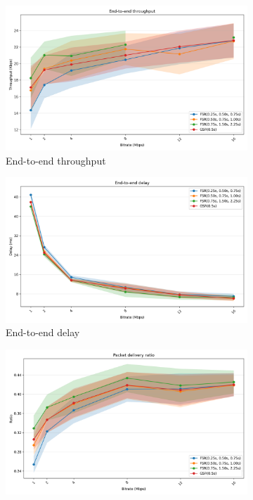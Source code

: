 \documentclass{winslabreport}
\begin{document}
\begin{figure}
    \centering
    \begin{subfigure}[b]{0.45\textwidth}
        \includegraphics[width=\textwidth]{../figures/bitrate/end-to-end_throughput.png}
        \caption{End-to-end throughput}
        \label{fig:tput_bitrate}
    \end{subfigure}
    \hfill
    \begin{subfigure}[b]{0.45\textwidth}
        \includegraphics[width=\textwidth]{../figures/bitrate/end-to-end_delay.png}
        \caption{End-to-end delay}
        \label{fig:delay_bitrate}
    \end{subfigure}
    \begin{subfigure}[b]{0.45\textwidth}
        \includegraphics[width=\textwidth]{../figures/bitrate/packet_delivery_ratio.png}

\end{subfigure}
\end{figure}
\end{document}

